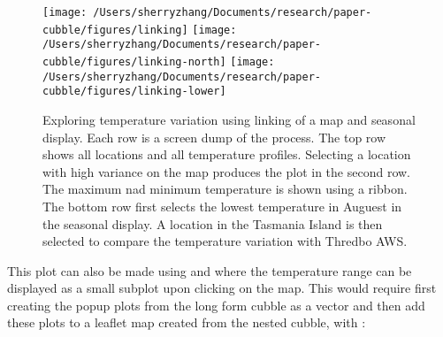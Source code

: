 \documentclass[
]{jss}
\begin{document}
\begin{CodeChunk}
\begin{figure}

{\centering \texttt{[image: /Users/sherryzhang/Documents/research/paper-cubble/figures/linking]} \texttt{[image: /Users/sherryzhang/Documents/research/paper-cubble/figures/linking-north]} \texttt{[image: /Users/sherryzhang/Documents/research/paper-cubble/figures/linking-lower]} 

}

\caption[Exploring temperature variation using linking of a map and seasonal display]{Exploring temperature variation using linking of a map and seasonal display. Each row is a screen dump of the process. The top row shows all locations and all temperature profiles. Selecting a location with high variance on the map produces the plot in the second row. The maximum nad minimum temperature is shown using a ribbon. The bottom row first selects the lowest temperature in Auguest in the seasonal display. A location in the Tasmania Island is then selected to compare the temperature variation with Thredbo AWS.}\label{fig:interactive-linking}
\end{figure}
\end{CodeChunk}

This plot can also be made using  and  where the temperature range can be displayed as a small subplot upon clicking on the map. This would require first creating the popup plots from the long form cubble as a vector and then add these plots to a leaflet map created from the nested cubble, with :
\end{document}
